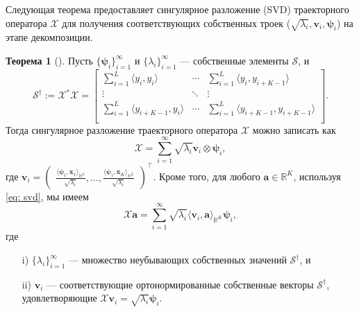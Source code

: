 \documentclass[12pt, specialist, subf
]{disser}
\theoremstyle{definition}
\newtheorem{theorem}{Теорема} %
\begin{document}
Следующая теорема предоставляет сингулярное разложение (SVD) траекторного оператора $\mathcal{X}$ для получения соответствующих собственных троек ($\sqrt{\lambda_i}, \pmb{v}_i, \pmb{\psi}_i$) на этапе декомпозиции.
\begin{theorem}[{\cite{haghbin2019functionalsingularspectrumanalysis}}]
	\label{thm:svd}
	Пусть ${\{\pmb{\psi}_i\}_{i=1}^\infty}$ и ${\{\lambda_i\}_{i=1}^\infty}$ — собственные элементы $\mathcal{S}$, и
	\begin{equation}
		\mathcal{S}^\dag:=\mathcal{X}^*\mathcal{X}=
		\begin{bmatrix}
			\sum_{i=1}^L\langle y_i, y_{i}\rangle       & \cdots & \sum_{i=1}^L\langle y_i, y_{i+K-1}\rangle       \\
			\vdots                                      & \ddots & \vdots                                          \\
			\sum_{i=1}^L\langle y_{i+K-1}, y_{i}\rangle & \cdots & \sum_{i=1}^L\langle y_{i+K-1}, y_{i+K-1}\rangle \\
		\end{bmatrix}.
	\end{equation}
	Тогда сингулярное разложение траекторного оператора $\mathcal{X}$ можно записать как
	\begin{equation}
		\label{eq: svd}
		\mathcal{X} = \sum_{i=1}^\infty \sqrt{\lambda_i}\textbf{v}_i\otimes \pmb{\psi}_i,
	\end{equation}
	где
	$\textbf{v}_i=
		\begin{pmatrix} \frac{\langle\pmb{\psi}_i, {\pmb x}_1\rangle_{\mathbb{H}^L}}{\sqrt{\lambda_i}} , \ldots,\frac{ \langle\pmb{\psi}_i, {\pmb x}_K\rangle_{\mathbb{H}^L}}{\sqrt{\lambda_i}} \end{pmatrix}^\top$. Кроме того, для любого $\pmb{a}\in\mathbb{R}^K$, используя \eqref{eq: svd}, мы имеем
	\begin{equation}
		\mathcal{X}\pmb{a} = \sum_{i=1}^\infty \sqrt{\lambda_i} \langle \textbf{v}_i, \pmb{a}\rangle_{\mathbb{R}^K} \pmb{\psi}_i,
	\end{equation}
	где
	\begin{itemize}
		\item[i)] $\{\lambda_i\}_{i=1}^\infty$ — множество неубывающих собственных значений $\mathcal{S}^\dag$, и
		\item[ii)] $\pmb{v}_i$ — соответствующие ортонормированные собственные векторы $\mathcal{S}^\dag$, удовлетворяющие $\mathcal{X}\pmb{v}_i = \sqrt{\lambda_i} \pmb{\psi}_i$.
	\end{itemize}
\end{theorem}
\end{document}
